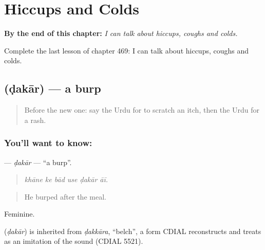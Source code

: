 
\chapter{Hiccups and Colds}
\label{ch:ur-hiccups-and-colds}

\begin{chapteropening}
\textbf{By the end of this chapter:} \emph{I can talk about hiccups, coughs and colds.}

Complete the last lesson of chapter 469: I can talk about hiccups, coughs and colds.
\end{chapteropening}

\section[\texorpdfstring{\ur{ڈکار} (ḍakār)}{ڈکار (ḍakār)}]{ (ḍakār) — a burp}

\label{lesson:UR-C469-dakar}



\begin{quote}
Before the new one: say the Urdu for to scratch an itch, then the Urdu for a rash.
\end{quote}

\subsection*{You'll want to know: }
\textbf{} — \emph{ḍakār} — \textquotedblleft{}a burp\textquotedblright{}.

\begin{quote}
     
\end{quote}

\begin{quote}
\emph{khāne ke bād use ḍakār āī.}
\end{quote}

\begin{quote}
He burped after the meal.
\end{quote}

Feminine.

\begin{cousinweb}
\textbf{} (\emph{ḍakār}) is inherited from \emph{ḍakkāra}, \textquotedblleft{}belch\textquotedblright{}, a form CDIAL reconstructs and treats as an imitation of the sound (CDIAL 5521).
\end{cousinweb}

